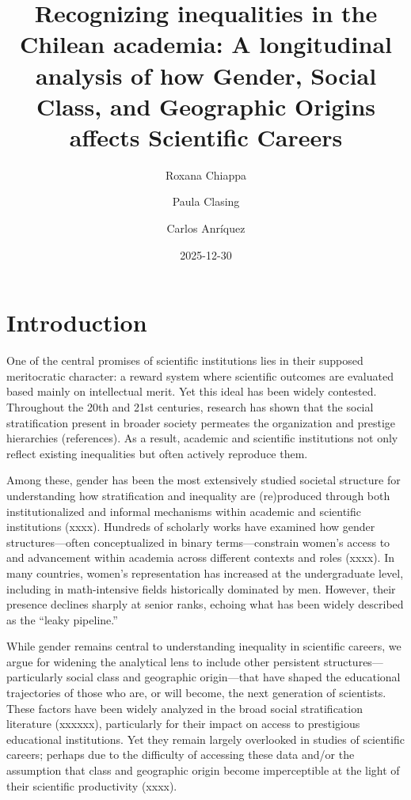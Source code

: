 \documentclass[
  spanish,
  12pt,
  letterpaper,
]{article}
\title{Recognizing inequalities in the Chilean academia: A longitudinal
analysis of how Gender, Social Class, and Geographic Origins affects
Scientific Careers}
\author{Roxana Chiappa \and Paula Clasing \and Carlos Anríquez}
\date{2025-12-30}
\begin{document}
\maketitle


\section{Introduction}\label{introduction}

One of the central promises of scientific institutions lies in their
supposed meritocratic character: a reward system where scientific
outcomes are evaluated based mainly on intellectual merit. Yet this
ideal has been widely contested. Throughout the 20th and 21st centuries,
research has shown that the social stratification present in broader
society permeates the organization and prestige hierarchies
(references). As a result, academic and scientific institutions not only
reflect existing inequalities but often actively reproduce them.

Among these, gender has been the most extensively studied societal
structure for understanding how stratification and inequality are
(re)produced through both institutionalized and informal mechanisms
within academic and scientific institutions (xxxx). Hundreds of
scholarly works have examined how gender structures---often
conceptualized in binary terms---constrain women's access to and
advancement within academia across different contexts and roles (xxxx).
In many countries, women's representation has increased at the
undergraduate level, including in math-intensive fields historically
dominated by men. However, their presence declines sharply at senior
ranks, echoing what has been widely described as the ``leaky pipeline.''

While gender remains central to understanding inequality in scientific
careers, we argue for widening the analytical lens to include other
persistent structures---particularly social class and geographic
origin---that have shaped the educational trajectories of those who are,
or will become, the next generation of scientists. These factors have
been widely analyzed in the broad social stratification literature
(xxxxxx), particularly for their impact on access to prestigious
educational institutions. Yet they remain largely overlooked in studies
of scientific careers; perhaps due to the difficulty of accessing these
data and/or the assumption that class and geographic origin become
imperceptible at the light of their scientific productivity (xxxx).
\end{document}
